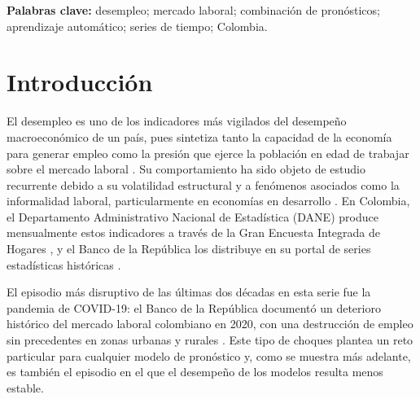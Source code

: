 \documentclass[11pt]{article}
\begin{document}
\noindent\textbf{Palabras clave:} desempleo; mercado laboral; combinación de pronósticos; aprendizaje automático; series de tiempo; Colombia.

\newpage

\section{Introducción}
\label{sec:intro}

El desempleo es uno de los indicadores más vigilados del desempeño macroeconómico de un país, pues sintetiza tanto la capacidad de la economía para generar empleo como la presión que ejerce la población en edad de trabajar sobre el mercado laboral \cite{phillips1958,okun1962}. Su comportamiento ha sido objeto de estudio recurrente debido a su volatilidad estructural y a fenómenos asociados como la informalidad laboral, particularmente en economías en desarrollo \cite{sanchez2013,berrio2019}. En Colombia, el Departamento Administrativo Nacional de Estadística (DANE) produce mensualmente estos indicadores a través de la Gran Encuesta Integrada de Hogares \cite{dane_geih}, y el Banco de la República los distribuye en su portal de series estadísticas históricas \cite{banrep2025series}.

El episodio más disruptivo de las últimas dos décadas en esta serie fue la pandemia de COVID-19: el Banco de la República documentó un deterioro histórico del mercado laboral colombiano en 2020, con una destrucción de empleo sin precedentes en zonas urbanas y rurales \cite{banrep2020covid}. Este tipo de choques plantea un reto particular para cualquier modelo de pronóstico y, como se muestra más adelante, es también el episodio en el que el desempeño de los modelos resulta menos estable.
\end{document}
